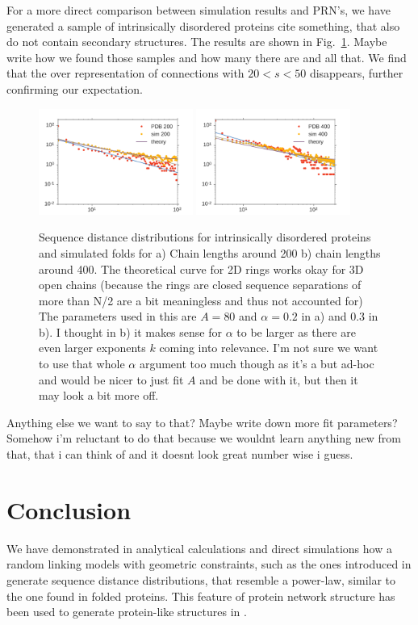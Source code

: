 \documentclass[reprint,amsmath,amssymb,rmp,onecolumn,notitlepage,11pt]{revtex4-1}
\newcommand{\red}[1]{\textcolor{red!80!black}{#1}}
\begin{document}
For a more direct comparison between simulation results and PRN's, we have generated a sample of intrinsically disordered proteins \red{cite something}, that also do not contain secondary structures. The results are shown in Fig.~\ref{fig:sdd_idp}.
\red{Maybe write how we found those samples and how many there are and all that.}
We find that the over representation of connections with $20<s<50$ disappears, further confirming our expectation.
\begin{figure}[h]
        \centering
	\includegraphics[width=0.45\textwidth]{figures/idp_200.pdf}
	\includegraphics[width=0.45\textwidth]{figures/idp_400.pdf}
        \caption{Sequence distance distributions for intrinsically disordered proteins and simulated folds for a) Chain lengths around 200 b) chain lengths around 400. The theoretical curve for 2D rings works okay for 3D open chains (because the rings are closed sequence separations of more than N/2 are a bit meaningless and thus not accounted for) The parameters used in this are $A=80$ and $\alpha=0.2$ in a) and $0.3$ in b). I thought in b) it makes sense for $\alpha$ to be larger as there are even larger exponents $k$ coming into relevance. I'm not sure we want to use that whole $\alpha$ argument too much though as it's a but ad-hoc and would be nicer to just fit $A$ and be done with it, but then it may look a bit more off.
        }
        \label{fig:sdd_idp}
\end{figure}
\red{Anything else we want to say to that? Maybe write down more fit parameters? Somehow i'm reluctant to do that because we wouldnt learn anything new from that, that i can think of and it doesnt look great number wise i guess.}
\section*{Conclusion}
We have demonstrated in analytical calculations and direct simulations how a random linking models with geometric constraints, such as the ones introduced in \cite{molkenthin2016scaling, molkenthin2020self} generate sequence distance distributions, that resemble a power-law, similar to the one found in folded proteins. This feature of protein network structure has been used to generate protein-like structures in \cite{bartoli2008effect}.
\end{document}
